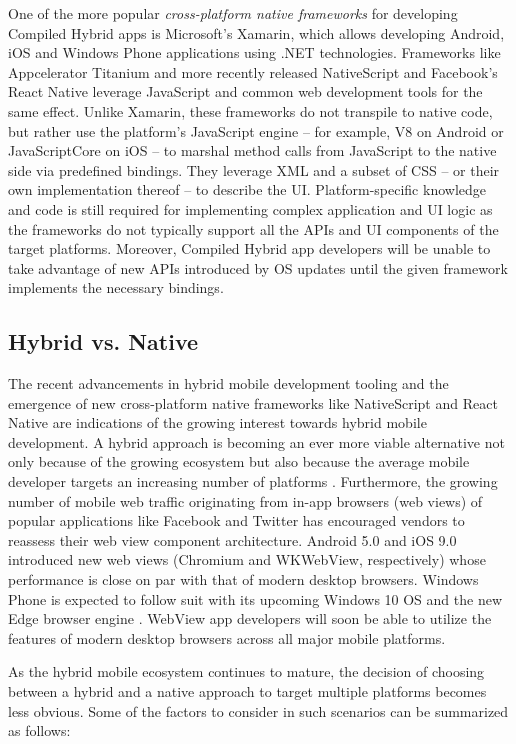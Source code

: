 \documentclass[thesis.tex]{subfiles}
\begin{document}
One of the more popular \textit{cross-platform native frameworks} for developing Compiled Hybrid apps is Microsoft's Xamarin, which allows developing Android, iOS and Windows Phone applications using .NET technologies. Frameworks like Appcelerator Titanium and more recently released NativeScript and Facebook's React Native leverage JavaScript and common web development tools for the same effect. Unlike Xamarin, these frameworks do not transpile to native code, but rather use the platform's JavaScript engine -- for example, V8 on Android or JavaScriptCore on iOS -- to marshal method calls from JavaScript to the native side via predefined bindings. They leverage XML and a subset of CSS -- or their own implementation thereof -- to describe the UI. Platform-specific knowledge and code is still required for implementing complex application and UI logic as the frameworks do not typically support all the APIs and UI components of the target platforms. Moreover, Compiled Hybrid app developers will be unable to take advantage of new APIs introduced by OS updates until the given framework implements the necessary bindings.

\subsection{Hybrid vs. Native}

The recent advancements in hybrid mobile development tooling and the emergence of new cross-platform native frameworks like NativeScript and React Native are indications of the growing interest towards hybrid mobile development. A hybrid approach is becoming an ever more viable alternative not only because of the growing ecosystem but also because the average mobile developer targets an increasing number of platforms \cite{two_platforms}. Furthermore, the growing number of mobile web traffic originating from in-app browsers (web views) of popular applications like Facebook and Twitter has encouraged vendors to reassess their web view component architecture. Android 5.0 and iOS 9.0 introduced new web views (Chromium and WKWebView, respectively) whose performance is close on par with that of modern desktop browsers. \cite{souders_webview} Windows Phone is expected to follow suit with its upcoming Windows 10 OS and the new Edge browser engine \cite{spartan}. WebView app developers will soon be able to utilize the features of modern desktop browsers across all major mobile platforms.

As the hybrid mobile ecosystem continues to mature, the decision of choosing between a hybrid and a native approach to target multiple platforms becomes less obvious. Some of the factors to consider in such scenarios can be summarized as follows:
\end{document}
